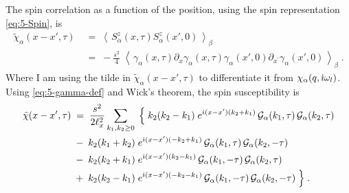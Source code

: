     
The spin correlation as a function of the position, using the spin representation \eqref{eq:5-Spin}, is 
\begin{equation}
\begin{split}
        \tilde{\chi}_{\alpha}(x-x',\tau) \; &= \;  \left\langle \, S_{\alpha}^{z}(x,\tau) S_{\alpha}^{z}(x',0) \,  \right\rangle_{\beta}  \\[5pt]
        &= \; -  \frac{s^2}{4} \; \left\langle \, \gamma_{\alpha}(x,\tau) \partial_x \gamma_{\alpha}(x,\tau)  \gamma_{\alpha}(x',0) \partial_{x^{\prime} } \gamma_{\alpha}(x',0) \,  \right\rangle_{\beta}  \; . \label{eq:6-spin-dynamical-susc-position}
\end{split}
\end{equation}
Where I am using the tilde in $\tilde{\chi}_{\alpha}(x-x',\tau)$ to differentiate it from $\chi_{\alpha}(q, \dot{\imath} \omega_l )$. Using \eqref{eq:5-gamma-def} and Wick's theorem, the spin susceptibility is 
\begin{equation}
    \begin{split}
    \tilde{\chi}(x-x',\tau) \; & = \; \frac{s^2}{2\ell_x^2} \sum_{k_{1},k_{2} \geq 0}  \;   \Big\{  \;          k_{2}(k_{2}-k_{1})  \;  e^{\dot{\imath}(x-x^{\prime})(k_{2}+k_{1})}\, \mathcal{G}_{\alpha}(k_{1} , \tau ) \, \mathcal{G}_{\alpha}(k_{2} , \tau ) 
        \\   & -  \; k_{2}(k_{1}+k_{2})  \;  e^{\dot{\imath}(x-x^{\prime})(-k_{2}+k_{1})} \,  \mathcal{G}_{\alpha}(k_{1} , \tau ) \, \mathcal{G}_{\alpha}(k_{2} , -\tau ) \;         \\
        &  -  \;   k_{2}(k_{2}+k_{1}) \;  e^{\dot{\imath}(x-x^{\prime})(k_{2}-k_{1})} \, \mathcal{G}_{\alpha}(k_{1} , -\tau ) \, \mathcal{G}_{\alpha}(k_{2} , \tau ) \;  \\ & + \;    k_{2}(k_{2}-k_{1}) \;  e^{\dot{\imath}(x-x^{\prime})(-k_{2}-k_{1})}\, \mathcal{G}_{\alpha}(k_{1} , -\tau ) \, \mathcal{G}_{\alpha}(k_{2} , -\tau ) \;  \Big\}  \label{eq:6-susceptiblility-x} \; .
    \end{split} 
\end{equation}

